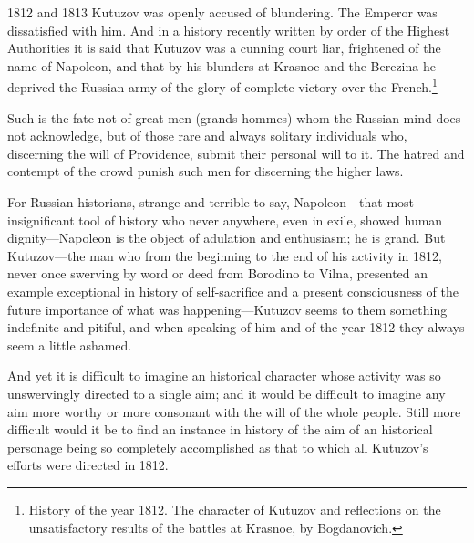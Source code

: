  1812 and 1813 Kutuzov was openly accused of blundering. The
Emperor was dissatisfied with him. And in a history recently
written by order of the Highest Authorities it is said that
Kutuzov was a cunning court liar, frightened of the name of
Napoleon, and that by his blunders at Krasnoe and the Berezina he
deprived the Russian army of the glory of complete victory over
the French.\footnote{History of the year 1812. The character of
Kutuzov and reflections on the unsatisfactory results of the
battles at Krasnoe, by Bogdanovich.}

Such is the fate not of great men (grands hommes) whom the
Russian mind does not acknowledge, but of those rare and always
solitary individuals who, discerning the will of Providence,
submit their personal will to it. The hatred and contempt of the
crowd punish such men for discerning the higher laws.

For Russian historians, strange and terrible to say,
Napoleon---that most insignificant tool of history who never
anywhere, even in exile, showed human dignity---Napoleon is the
object of adulation and enthusiasm; he is grand. But
Kutuzov---the man who from the beginning to the end of his
activity in 1812, never once swerving by word or deed from
Borodino to Vilna, presented an example exceptional in history of
self-sacrifice and a present consciousness of the future
importance of what was happening---Kutuzov seems to them
something indefinite and pitiful, and when speaking of him and of
the year 1812 they always seem a little ashamed.

And yet it is difficult to imagine an historical character whose
activity was so unswervingly directed to a single aim; and it
would be difficult to imagine any aim more worthy or more
consonant with the will of the whole people. Still more difficult
would it be to find an instance in history of the aim of an
historical personage being so completely accomplished as that to
which all Kutuzov's efforts were directed in 1812.

